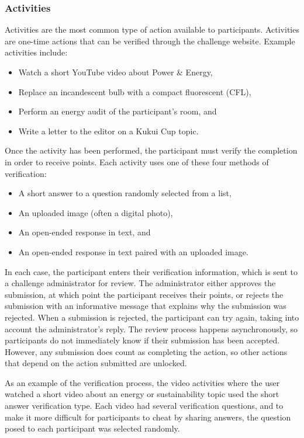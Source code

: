 \subsubsection{Activities}
\label{sec:activities}

Activities are the most common type of action available to participants. Activities are one-time actions that can be verified through the challenge website. Example activities include:

\begin{itemize}
	\item Watch a short YouTube video about Power \& Energy,
	\item Replace an incandescent bulb with a compact fluorescent (CFL),
	\item Perform an energy audit of the participant's room, and
	\item Write a letter to the editor on a Kukui Cup topic.
\end{itemize}

Once the activity has been performed, the participant must verify the completion in order to receive points. Each activity uses one of these four methods of verification:

\begin{itemize}
	\item A short answer to a question randomly selected from a list,
	\item An uploaded image (often a digital photo),
	\item An open-ended response in text, and 
	\item An open-ended response in text paired with an uploaded image.
\end{itemize}

In each case, the participant enters their verification information, which is sent to a challenge administrator for review. The administrator either approves the submission, at which point the participant receives their points, or rejects the submission with an informative message that explains why the submission was rejected. When a submission is rejected, the participant can try again, taking into account the administrator's reply. The review process happens asynchronously, so participants do not immediately know if their submission has been accepted. However, any submission does count as completing the action, so other actions that depend on the action submitted are unlocked.

As an example of the verification process, the video activities where the user watched a short video about an energy or sustainability topic used the short answer verification type. Each video had several verification questions, and to make it more difficult for participants to cheat by sharing answers, the question posed to each participant was selected randomly.

